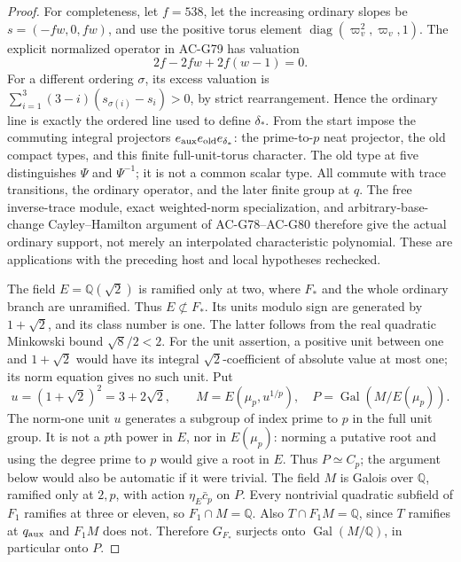 \begin{proof}
For completeness, let \(f=538\), let the increasing ordinary
slopes be \(s=(-fw,0,fw)\), and use the positive torus element
\(\operatorname{diag}(\varpi_v^2,\varpi_v,1)\).
The explicit normalized operator in AC-G79 has valuation
\[
                  2f-2fw+2f(w-1)=0 .
\]
For a different ordering \(\sigma\), its excess valuation is
\(\sum_{i=1}^3(3-i)(s_{\sigma(i)}-s_i)>0\), by strict
rearrangement.  Hence the ordinary line is exactly the ordered
line used to define \(\delta_*\).
From the start impose the commuting integral projectors
\(e_{\rm aux}e_{\rm old}e_{\delta_*}\): the prime-to-\(p\)
neat projector, the old compact types, and this finite
full-unit-torus character.
The old type at five distinguishes \(\Psi\) and \(\Psi^{-1}\);
it is not a common scalar type.
All commute with trace transitions, the ordinary operator,
and the later finite group at \(q\).
The free inverse-trace module, exact weighted-norm specialization,
and arbitrary-base-change Cayley--Hamilton argument of
AC-G78--AC-G80 therefore give the actual ordinary support,
not merely an interpolated characteristic polynomial.
These are applications with the preceding host and local
hypotheses rechecked.

The field \(E=\mathbb Q(\sqrt2)\) is ramified only at two,
where \(F_*\) and the whole ordinary branch are unramified.
Thus \(E\not\subset F_*\).
Its units modulo sign are generated by \(1+\sqrt2\), and
its class number is one.  The latter follows from the real
quadratic Minkowski bound \(\sqrt8/2<2\).
For the unit assertion, a positive unit between one and
\(1+\sqrt2\) would have its integral \(\sqrt2\)-coefficient
of absolute value at most one; its norm equation gives no
such unit.  Put
\[
 u=(1+\sqrt2)^2=3+2\sqrt2,
 \qquad M=E(\mu_p,u^{1/p}),\quad
 P=\operatorname{Gal}(M/E(\mu_p)).
 \tag{G138.14}
\]
The norm-one unit \(u\) generates a subgroup of index prime
to \(p\) in the full unit group.
It is not a \(p\)th power in \(E\), nor in \(E(\mu_p)\):
norming a putative root and using the degree prime to \(p\)
would give a root in \(E\).
Thus \(P\simeq C_p\); the argument below would also be
automatic if it were trivial.
The field \(M\) is Galois over \(\mathbb Q\), ramified only
at \(2,p\), with action \(\eta_E\bar c_p\) on \(P\).
Every nontrivial quadratic subfield of \(F_1\) ramifies at
three or eleven, so \(F_1\cap M=\mathbb Q\).
Also \(T\cap F_1M=\mathbb Q\), since \(T\) ramifies at
\(q_{\rm aux}\) and \(F_1M\) does not.  Therefore \(G_{F_*}\)
surjects onto \(\operatorname{Gal}(M/\mathbb Q)\), in particular
onto \(P\).


\end{proof}
